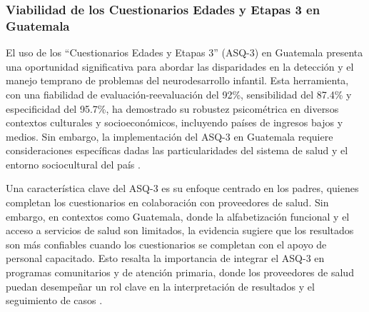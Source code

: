 \subsubsection{Viabilidad de los Cuestionarios Edades y Etapas 3 en Guatemala}
El uso de los ``Cuestionarios Edades y Etapas 3'' (ASQ-3) en Guatemala presenta
una oportunidad significativa para abordar las disparidades en la detección y
el manejo temprano de problemas del neurodesarrollo infantil. Esta herramienta,
con una fiabilidad de evaluación-reevaluación del 92\%, sensibilidad del 87.4\%
y especificidad del 95.7\%, ha demostrado su robustez psicométrica en diversos
contextos culturales y socioeconómicos, incluyendo países de ingresos bajos y
medios. Sin embargo, la implementación del ASQ-3 en Guatemala requiere
consideraciones específicas dadas las particularidades del sistema de salud y
el entorno sociocultural del país \cite{Vameghi2013-uo, Manasyan2023}.

Una característica clave del ASQ-3 es su enfoque centrado en los padres,
quienes completan los cuestionarios en colaboración con proveedores de salud.
Sin embargo, en contextos como Guatemala, donde la alfabetización funcional y
el acceso a servicios de salud son limitados, la evidencia sugiere que los
resultados son más confiables cuando los cuestionarios se completan con el
apoyo de personal capacitado. Esto resalta la importancia de integrar el ASQ-3
en programas comunitarios y de atención primaria, donde los proveedores de
salud puedan desempeñar un rol clave en la interpretación de resultados y el
seguimiento de casos \cite{Manasyan2023, Colbert2021}.
